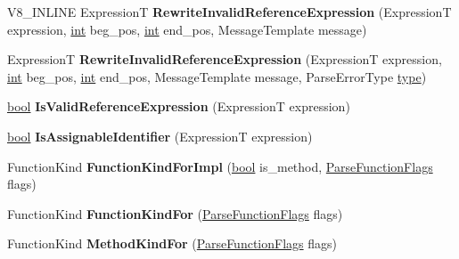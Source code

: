 \begin{DoxyCompactItemize}
V8\+\_\+\+I\+N\+L\+I\+NE ExpressionT {\bfseries Rewrite\+Invalid\+Reference\+Expression} (ExpressionT expression, \mbox{\hyperlink{classint}{int}} beg\+\_\+pos, \mbox{\hyperlink{classint}{int}} end\+\_\+pos, Message\+Template message)
\item 
\mbox{\label{classv8_1_1internal_1_1ParserBase_ae7c2b52131dce8b83e7655d1af075f92}} 
ExpressionT {\bfseries Rewrite\+Invalid\+Reference\+Expression} (ExpressionT expression, \mbox{\hyperlink{classint}{int}} beg\+\_\+pos, \mbox{\hyperlink{classint}{int}} end\+\_\+pos, Message\+Template message, Parse\+Error\+Type \mbox{\hyperlink{classstd_1_1conditional_1_1type}{type}})
\item 
\mbox{\label{classv8_1_1internal_1_1ParserBase_aac99e142f873e512e0d74bfd562309fb}} 
\mbox{\hyperlink{classbool}{bool}} {\bfseries Is\+Valid\+Reference\+Expression} (ExpressionT expression)
\item 
\mbox{\label{classv8_1_1internal_1_1ParserBase_a1fb2aae2b1289321af8d046ec73083c8}} 
\mbox{\hyperlink{classbool}{bool}} {\bfseries Is\+Assignable\+Identifier} (ExpressionT expression)
\item 
\mbox{\label{classv8_1_1internal_1_1ParserBase_ac7575d84e9a888f7ff5afc89f76a6d7d}} 
Function\+Kind {\bfseries Function\+Kind\+For\+Impl} (\mbox{\hyperlink{classbool}{bool}} is\+\_\+method, \mbox{\hyperlink{classv8_1_1base_1_1Flags}{Parse\+Function\+Flags}} flags)
\item 
\mbox{\label{classv8_1_1internal_1_1ParserBase_a83002a686dc78b5b41d120eae4861ef8}} 
Function\+Kind {\bfseries Function\+Kind\+For} (\mbox{\hyperlink{classv8_1_1base_1_1Flags}{Parse\+Function\+Flags}} flags)
\item 
\mbox{\label{classv8_1_1internal_1_1ParserBase_ad58d91e34289cfe441906556b6e185df}} 
Function\+Kind {\bfseries Method\+Kind\+For} (\mbox{\hyperlink{classv8_1_1base_1_1Flags}{Parse\+Function\+Flags}} flags)
\item 
\mbox{\label{classv8_1_1internal_1_1ParserBase_a20f829e7100397275c07f85042fb295d}} 

\end{DoxyCompactItemize}
